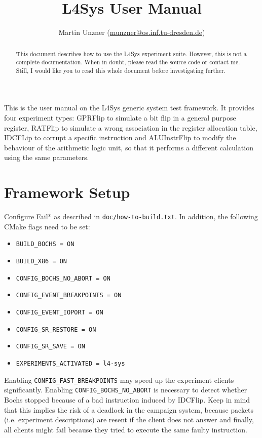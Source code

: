 \documentclass[a4paper,10pt]{article}
\title{L4Sys User Manual}
\author{Martin Unzner (\href{mailto:munzner@os.inf.tu-dresden.de}{munzner@os.inf.tu-dresden.de})}
\begin{document}
\maketitle

\begin{abstract}
This document describes how to use the L4Sys experiment suite.
However, this is not a complete documentation. When in doubt,
please read the source code or contact me. Still, I would like
you to read this whole document before investigating further.
\end{abstract}

This is the user manual on the L4Sys generic system test framework.
It provides four experiment types: GPRFlip to simulate a bit flip
in a general purpose register, RATFlip to simulate a wrong association
in the register allocation table, IDCFLip to corrupt a specific instruction
and ALUInstrFlip to modify the behaviour of the arithmetic logic unit,
so that it performs a different calculation using the same parameters.

\section{Framework Setup}

Configure Fail* as described in \texttt{doc/how-to-build.txt}. In addition,
the following CMake flags need to be set:

\begin{itemize}
\item \verb+BUILD_BOCHS = ON+
\item \verb+BUILD_X86 = ON+
\item \verb+CONFIG_BOCHS_NO_ABORT = ON+
\item \verb+CONFIG_EVENT_BREAKPOINTS = ON+
\item \verb+CONFIG_EVENT_IOPORT = ON+
\item \verb+CONFIG_SR_RESTORE = ON+
\item \verb+CONFIG_SR_SAVE = ON+
\item \verb+EXPERIMENTS_ACTIVATED = l4-sys+
\end{itemize}

Enabling \verb+CONFIG_FAST_BREAKPOINTS+ may speed up the experiment clients
significantly. Enabling \verb+CONFIG_BOCHS_NO_ABORT+ is necessary to detect
whether Bochs stopped because of a bad instruction induced by IDCFlip.
Keep in mind that this implies the risk of a deadlock
in the campaign system, because packets (i.e. experiment descriptions)
are resent if the client does not answer and finally, all clients
might fail because they tried to execute the same faulty instruction.
\end{document}
